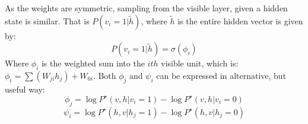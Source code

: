   As the weights are symmetric, sampling from the visible layer, given a hidden state is similar. That is $P(v_i = 1 | \tilde{h})$, where $\tilde{h}$ is the entire hidden vector is given by:
  \begin{equation}\label{eq:Vis-Gibbs-Update}
   P(v_i = 1 | \tilde{h}) = \sigma(\phi_{i})
  \end{equation}
  Where $\phi_i$ is the weighted sum into the $ith$ visible unit, which is: $ \phi_i = \sum(W_{ji}h_{j}) + W_{0i} $. Both $\phi_j$ and $\psi_i$ can be expressed in alternative, but useful way:
  \begin{equation}
  \phi_j = \log P^\star(v,h | v_i = 1) - \log P^\star(v,h | v_i = 0)
  \end{equation}
  \begin{equation}\label{psi-gibbs-update-rbm}
  \psi_i = \log P^\star(h,v | h_j = 1) - \log P^\star(h,v | h_j = 0)
  \end{equation}









